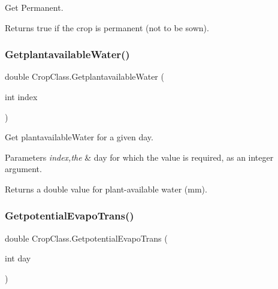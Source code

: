 Get Permanent. 

\begin{DoxyReturn}{Returns}
true if the crop is permanent (not to be sown). 
\end{DoxyReturn}
\mbox{\label{class_crop_class_a4c6eada04185e8600ba098d364aea67c}} 
\subsubsection{\texorpdfstring{GetplantavailableWater()}{GetplantavailableWater()}}
{\footnotesize\ttfamily double Crop\+Class.\+Getplantavailable\+Water (\begin{DoxyParamCaption}\item[{int}]{index }\end{DoxyParamCaption})\hspace{0.3cm}{\ttfamily [inline]}}



Get plantavailable\+Water for a given day. 


\begin{DoxyParams}{Parameters}
{\em index,the} & day for which the value is required, as an integer argument. \\
\hline
\end{DoxyParams}
\begin{DoxyReturn}{Returns}
a double value for plant-\/available water (mm). 
\end{DoxyReturn}
\mbox{\label{class_crop_class_aaff60f42755eee618996358238af406f}} 
\subsubsection{\texorpdfstring{GetpotentialEvapoTrans()}{GetpotentialEvapoTrans()}}
{\footnotesize\ttfamily double Crop\+Class.\+Getpotential\+Evapo\+Trans (\begin{DoxyParamCaption}\item[{int}]{day }\end{DoxyParamCaption})\hspace{0.3cm}{\ttfamily [inline]}}



